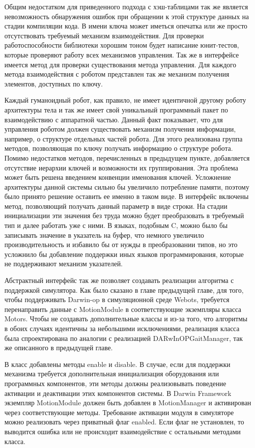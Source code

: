 Общим недостатком для приведенного подхода с хэш-таблицами так же является невозможность обнаружения ошибок при обращении к этой структуре данных на стадии компиляции кода. В имени ключа может иметься опечатка или же просто отсутствовать требуемый механизм взаимодействия. Для проверки работоспособности библиотеки хорошим тоном будет написание юнит-тестов, которые проверяют работу всех механизмов управления. Так же в интерфейсе имеется метод для проверки существования метода управления. Для каждого метода взаимодействия с роботом представлен так же механизм получения элементов, доступных по ключу.

Каждый гуманоидный робот, как правило, не имеет идентичной другому роботу архитектуры тела и так же имеет свой уникальный программный пакет по взаимодействию с аппаратной частью. Данный факт показывает, что для управления роботом должен существовать механизм получения информации, например, о структуре отдельных частей робота. Для этого реализована группа методов, позволяющая по ключу получать информацию о структуре робота. Помимо недостатков методов, перечисленных в предыдущем пункте, добавляется отсутствие иерархии ключей и возможности их группирования. Эта проблема может быть решена введением конвенции именования ключей. Усложнение архитектуры данной системы сильно бы увеличило потребление памяти, поэтому было принято решение оставить ее именно в таком виде. В интерфейс включены метод, позволяющий получать данный параметр в виде строки. На стадии инициализации эти значения без труда можно будет преобразовать в требуемый тип и далее работать уже с ними. В языках, подобным C, можно было бы записывать значение в указатель на буфер, что немного увеличило производительность и избавило бы от нужды в преобразовании типов, но это усложнило бы добавление поддержки иных языков программирования, которые не поддерживают механизм указателей.

Абстрактный интерфейс так же позволяет создавать реализации алгоритма с поддержкой симулятора. Как было сказано в главе предыдущей главе, для того, чтобы поддерживать Darwin-op в симуляционной среде Webots, требуется перенаправить данные с MotionModule в соответствующие экземпляры класса Motors. Чтобы не создавать дополнительные классы и из-за того, что алгоритмы в обоих случаях идентичны за небольшими исключениями, реализация класса была спроектирована по аналогии с реализацией DARwInOPGaitManager, так же описанного в предыдущей главе.

В класс добавлены методы enable и disable. В случае, если для поддержки механизма требуется дополнительная инициализация оборудования или программных компонентов, эти методы должны реализовывать поведение активации и деактивации этих компонентов системы. В Darwin Framework экземпляр MotionModule должен быть добавлен в MotionManager и активирован через соответствующие методы. Требование активации модуля в симуляторе можно реализовать через приватный флаг enabled. Если флаг не установлен, то выводится ошибка или не происходит взаимодействие с остальными методами класса.


